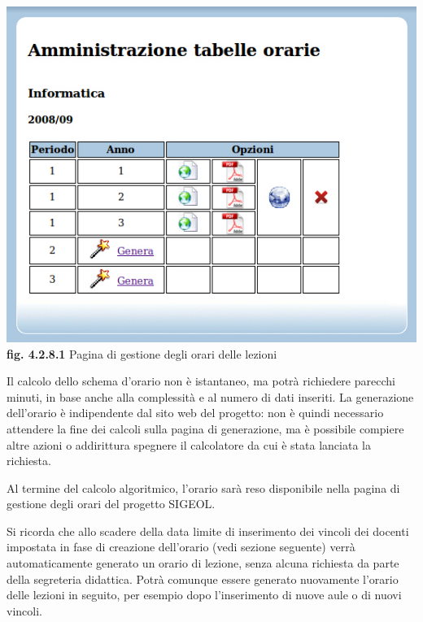 \documentclass[11pt,a4paper]{article}
\begin{document}
\bigskip
\begin{center}
	\includegraphics[scale=0.5]{images/amministrazione_orario.jpg}\\
	\textbf{fig. 4.2.8.1} Pagina di gestione degli orari delle lezioni\\
\end{center}
\bigskip

Il calcolo dello schema d'orario non è istantaneo, ma potrà richiedere parecchi minuti, in base anche alla complessità e al numero di dati inseriti.
La generazione dell'orario è indipendente dal sito web del progetto: non è quindi necessario attendere la fine dei calcoli sulla pagina di generazione, ma è possibile compiere altre azioni o addirittura spegnere il calcolatore da cui è stata lanciata la richiesta.

Al termine del calcolo algoritmico, l'orario sarà reso disponibile nella pagina di gestione degli orari del progetto SIGEOL.

Si ricorda che allo scadere della data limite di inserimento dei vincoli dei docenti impostata in fase di creazione dell'orario (vedi sezione seguente) verrà automaticamente generato un orario di lezione, senza alcuna richiesta da parte della segreteria didattica. Potrà comunque essere generato nuovamente l'orario delle lezioni in seguito, per esempio dopo l'inserimento di nuove aule o di nuovi vincoli.
\end{document}
